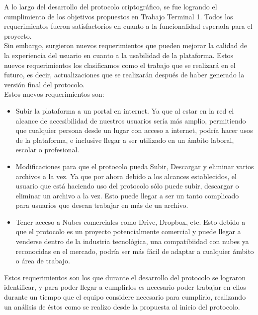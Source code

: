 A lo largo del desarrollo del protocolo criptográfico, se fue logrando el cumplimiento de los objetivos propuestos en Trabajo Terminal 1. Todos los requerimientos fueron satisfactorios en cuanto a la funcionalidad esperada para el proyecto. \\
Sin embargo, surgieron nuevos requerimientos que pueden mejorar la calidad de la experiencia del usuario en cuanto a la usabilidad de la plataforma. Estos nuevos requerimientos los clasificamos como el trabajo que se realizará en el futuro, es decir, actualizaciones que se realizarán después de haber generado la versión final del protocolo. \\
Estos nuevos requerimientos son: \\
\begin{itemize}
    \item Subir la plataforma a un portal en internet.  Ya que al estar en la red el alcance de accesibilidad de nuestros usuarios sería más amplio, permitiendo que cualquier persona desde un lugar con acceso a internet, podría hacer usos de la plataforma, e inclusive llegar a ser utilizado en un ámbito laboral, escolar o profesional.
    \item Modificaciones para que el protocolo pueda Subir, Descargar y eliminar varios archivos a la vez. Ya que por ahora debido a los alcances establecidos, el usuario que está haciendo uso del protocolo sólo puede subir, descargar o eliminar un archivo a la vez. Esto puede llegar a ser un tanto complicado para usuarios que desean trabajar en más de un archivo.
    \item Tener acceso a Nubes comerciales como Drive, Dropbox, etc. Esto debido a que el protocolo es un proyecto potencialmente comercial y puede llegar a venderse dentro de la industria tecnológica, una compatibiidad con nubes ya reconocidas en el mercado, podría ser más fácil de adaptar a cualquier ámbito o área de trabajo.\\
\end{itemize}

Estos requerimientos son los que durante el desarrollo del protocolo se lograron identificar, y para poder llegar a cumplirlos es necesario poder trabajar en ellos durante un tiempo que el equipo considere necesario para cumplirlo, realizando un análisis de éstos como se realizo desde la propuesta al inicio del protocolo. 